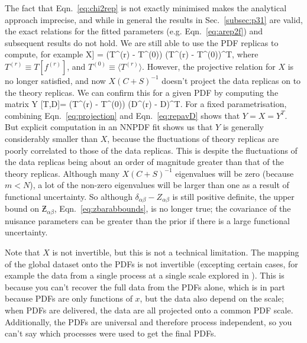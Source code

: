 The fact that Eqn.~\ref{eq:chi2rep} is not exactly minimised makes the analytical approach imprecise, and while in general the results in Sec.~\ref{subsec:p31} are valid, the exact relations for the fitted parameters (e.g. Eqn.~\ref{eq:arep2f}) and subsequent results do not hold. We are still able to use the PDF replicas to compute, for example
\be
X\equiv\Cov[T[f]] = \langle (T^{(r)} - T^{(0)}) (T^{(r)} - T^{(0)})^T\rangle,
\label{eq:Xdefgen}
\ee
where $T^{(r)}\equiv T[f^{(r)}]$, and $T^{(0)}\equiv \langle T^{(r)}\rangle$. However, the projective relation for $X$ is no longer satisfied, and now $X(C+S)^{-1}$ doesn't project the data replicas on to the theory replicas. We can confirm this for a given PDF by computing the matrix
\be
Y [T,D]= \langle (T^{(r)} - T^{(0)}) (D^{(r)} - D)^T\rangle.
\label{eq:YdefNN}
\ee
For a fixed parametrisation, combining Eqn.~\ref{eq:projection} and Eqn.~\ref{eq:repavD} shows that $Y=X=Y^T$. But explicit computation in an NNPDF fit shows us that $Y$ is generally considerably smaller than $X$, because the fluctuations of theory replicas are poorly correlated to those of the data replicas. This is despite the fluctuations of the data replicas being about an order of magnitude greater than that of the theory replicas. Although many $X(C+S)^{-1}$ eigenvalues will be zero (because $m < N$), a lot of the non-zero eigenvalues will be larger than one as a result of functional uncertainty. So although $\delta_{\alpha\beta}-Z_{\alpha\beta}$ is still positive definite, the upper bound on $\Zbar_{\alpha\beta}$, Eqn.~\ref{eq:zbarabbounds}, is no longer true; the covariance of the nuisance parameters can be greater than the prior if there is a large functional uncertainty. 

Note that $X$ is not invertible, but this is not a technical limitation. The mapping of the global dataset onto the PDFs is not invertible (excepting certain cases, for example the data from a single process at a single scale explored in \cite{Harland-Lang:2018bxd}). This is because you can't recover the full data from the PDFs alone, which is in part because PDFs are only functions of $x$, but the data also depend on the scale; when PDFs are delivered, the data are all projected onto a common PDF scale. Additionally, the PDFs are universal and therefore process independent, so you can't say which processes were used to get the final PDFs. 

